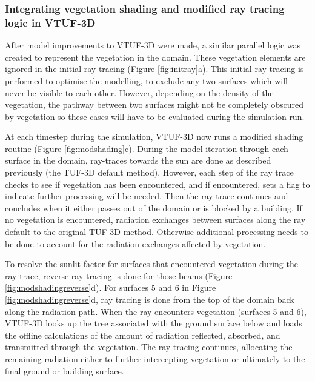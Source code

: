 \documentclass[final,3p,times,authoryear]{elsarticle}
\begin{document}
\subsubsection{Integrating vegetation shading and modified ray tracing logic in VTUF-3D}\label{sec:Representationofvegetation}

After model improvements to VTUF-3D were made, a similar parallel logic was created to represent the vegetation in the domain. These vegetation elements are ignored in the initial ray-tracing (Figure \ref{fig:initray}a). This initial ray tracing is performed to optimise the modelling, to exclude any two surfaces which will never be visible to each other. However, depending on the density of the vegetation, the pathway between two surfaces might not be completely obscured by vegetation so these cases will have to be evaluated during the simulation run.

At each timestep during the simulation, VTUF-3D now runs a modified shading routine (Figure \ref{fig:modshading}c). During the model iteration through each surface in the domain, ray-traces towards the sun are done as described previously (the TUF-3D default method). However, each step of the ray trace checks to see if vegetation has been encountered, and if encountered, sets a flag to indicate further processing will be needed. Then the ray trace continues and concludes when it either passes out of the domain or is blocked by a building. If no vegetation is encountered, radiation exchanges between surfaces along the ray default to the original TUF-3D method. Otherwise additional processing needs to be done to account for the radiation exchanges affected by vegetation.

To resolve the sunlit factor for surfaces that encountered vegetation during the ray trace, reverse ray tracing is done for those beams (Figure \ref{fig:modshadingreverse}d). For surfaces 5 and 6 in Figure \ref{fig:modshadingreverse}d, ray tracing is done from the top of the domain back along the radiation path. When the ray encounters vegetation (surfaces 5 and 6), VTUF-3D looks up the tree associated with the ground surface below and loads the offline calculations of the amount of radiation reflected, absorbed, and transmitted through the vegetation. The ray tracing continues, allocating the remaining radiation either to further intercepting vegetation or ultimately to the final ground or building surface.
\end{document}
